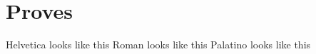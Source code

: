 \chapter{Proves}

{\selectfont Helvetica looks like this}
\newline
\newline
\newline
\noindent
Roman looks like this
\newline
\newline
\newline
\noindent
{ Palatino looks like this}


